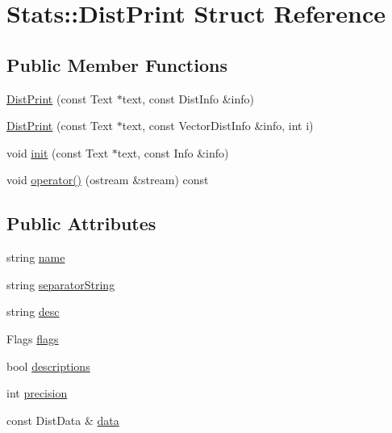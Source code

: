 \hypertarget{structStats_1_1DistPrint}{
\section{Stats::DistPrint Struct Reference}
\label{structStats_1_1DistPrint}
}
\subsection*{Public Member Functions}
\begin{DoxyCompactItemize}
\item 
\hyperlink{structStats_1_1DistPrint_a02bef5dd3b54fc1e6cc78cad64c32bd0}{DistPrint} (const Text $\ast$text, const DistInfo \&info)
\item 
\hyperlink{structStats_1_1DistPrint_a37e35a85600748fd9d6a55f7cc13a3a3}{DistPrint} (const Text $\ast$text, const VectorDistInfo \&info, int i)
\item 
void \hyperlink{structStats_1_1DistPrint_a452bd30d5d3b11bebbd78143888afa2e}{init} (const Text $\ast$text, const Info \&info)
\item 
void \hyperlink{structStats_1_1DistPrint_aa51349aa88ffc6493871b704b51deb16}{operator()} (ostream \&stream) const 
\end{DoxyCompactItemize}
\subsection*{Public Attributes}
\begin{DoxyCompactItemize}
\item 
string \hyperlink{structStats_1_1DistPrint_a8effa42b5694542dac7f6fb7f1df4230}{name}
\item 
string \hyperlink{structStats_1_1DistPrint_a9efef83fe3bbe8076c1b902e00204ca7}{separatorString}
\item 
string \hyperlink{structStats_1_1DistPrint_a20c3c6840bcaefcbd8a9ecbc468421da}{desc}
\item 
Flags \hyperlink{structStats_1_1DistPrint_a29f5554b5ad6a9b573fa8e0c4286a128}{flags}
\item 
bool \hyperlink{structStats_1_1DistPrint_a9b91df398053c0c61986dafcc2576c01}{descriptions}
\item 
int \hyperlink{structStats_1_1DistPrint_ac1229f4102622ff8182e625410a7dfc5}{precision}
\item 
const DistData \& \hyperlink{structStats_1_1DistPrint_a5a1a2f61a36cddf75ea5b9de60c02aa1}{data}
\end{DoxyCompactItemize}


